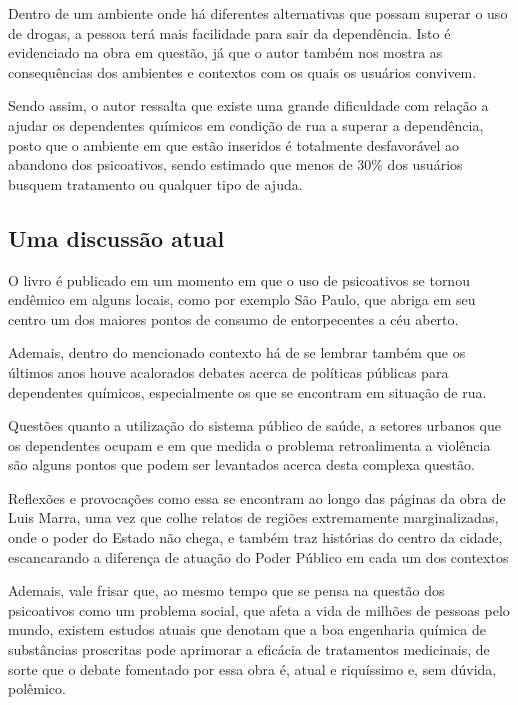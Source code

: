 \documentclass[11pt]{extarticle}
\begin{document}
Dentro de um ambiente onde há diferentes alternativas que possam superar
o uso de drogas, a pessoa terá mais facilidade para sair da dependência.
Isto é evidenciado na obra em questão, já que o autor também nos mostra
as consequências dos ambientes e contextos com os quais os usuários
convivem.

Sendo assim, o autor ressalta que existe uma grande dificuldade com
relação a ajudar os dependentes químicos em condição de rua a superar a
dependência, posto que o ambiente em que estão inseridos é totalmente
desfavorável ao abandono dos psicoativos, sendo estimado que menos de
30\% dos usuários busquem tratamento ou qualquer tipo de ajuda.

\subsection{Uma discussão atual}

O livro é publicado em um momento em que o uso de psicoativos se tornou
endêmico em alguns locais, como por exemplo São Paulo, que abriga em seu
centro um dos maiores pontos de consumo de entorpecentes a céu aberto.


Ademais, dentro do mencionado contexto há de se lembrar também que os
últimos anos houve acalorados debates acerca de políticas públicas para
dependentes químicos, especialmente os que se encontram em situação de
rua.

Questões quanto a utilização do sistema público de saúde, a setores
urbanos que os dependentes ocupam e em que medida o problema
retroalimenta a violência são alguns pontos que podem ser levantados
acerca desta complexa questão.

Reflexões e provocações como essa se encontram ao longo das páginas da
obra de Luis Marra, uma vez que colhe relatos de regiões extremamente
marginalizadas, onde o poder do Estado não chega, e também traz
histórias do centro da cidade, escancarando a diferença de atuação do
Poder Público em cada um dos contextos

Ademais, vale frisar que, ao mesmo tempo que se pensa na questão dos
psicoativos como um problema social, que afeta a vida de milhões de
pessoas pelo mundo, existem estudos atuais que denotam que a boa
engenharia química de substâncias proscritas pode aprimorar a eficácia
de tratamentos medicinais, de sorte que o debate fomentado por essa obra
é, atual e riquíssimo e, sem dúvida, polêmico.
\end{document}
